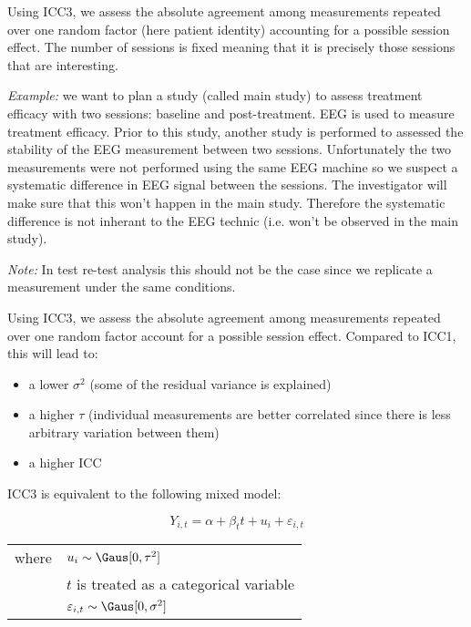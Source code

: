 \documentclass[12pt]{article}
\begin{document}
Using ICC3, we assess the absolute agreement among measurements
repeated over one random factor (here patient identity) accounting for
a possible session effect. The number of sessions is fixed meaning
that it is precisely those sessions that are interesting.

\bigskip

\emph{Example:} we want to plan a study (called main study) to assess
treatment efficacy with two sessions: baseline and post-treatment. EEG
is used to measure treatment efficacy. Prior to this study, another
study is performed to assessed the stability of the EEG measurement
between two sessions. Unfortunately the two measurements were not
performed using the same EEG machine so we suspect a systematic
difference in EEG signal between the sessions. The investigator will
make sure that this won't happen in the main study. Therefore the
systematic difference is not inherant to the EEG technic (i.e. won't
be observed in the main study).

\bigskip

\emph{Note:}  In test
re-test analysis this should not be the case since we replicate a
measurement under the same conditions.

\bigskip
\bigskip

Using ICC3, we assess the absolute agreement among measurements
repeated over one random factor account for a possible session
effect. Compared to ICC1, this will lead to:
\begin{itemize}
\item a lower \(\sigma^2\) (some of the residual variance is explained)
\item a higher \(\tau\) (individual measurements are better correlated since
there is less arbitrary variation between them)
\item a higher ICC
\end{itemize}

\bigskip

ICC3 is equivalent to the following mixed model:

\begin{equation}
 Y_{i,t} = \alpha + \beta_t t + u_{i} + \varepsilon_{i,t} 
\end{equation}

\begin{tabular}{ll}
where & \(u_{i} \sim \Gaus[0,\tau^2] \)  \\
& \(t\) is treated as a categorical variable \\
& \(\varepsilon_{i,t} \sim \Gaus[0,\sigma^2] \) \\
\end{tabular}
\end{document}
